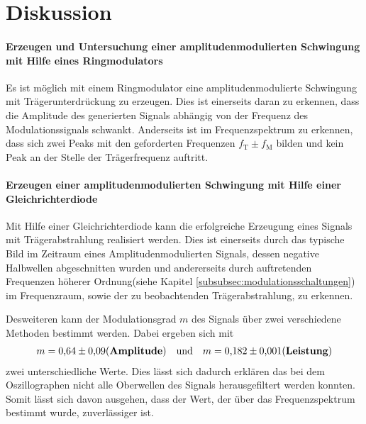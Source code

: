 \FloatBarrier
\section{Diskussion}
\label{sec:Diskussion}

\paragraph{Erzeugen und Untersuchung einer amplitudenmodulierten Schwingung mit
Hilfe eines Ringmodulators}
Es ist möglich mit einem Ringmodulator
eine amplitudenmodulierte Schwingung
mit Trägerunterdrückung zu erzeugen.
Dies ist einerseits daran zu erkennen,
dass die Amplitude des generierten Signals abhängig
von der Frequenz des Modulationssignals schwankt.
%
Anderseits ist im Frequenzspektrum zu erkennen, dass sich zwei
Peaks mit den geforderten Frequenzen $f_{\text{T}}\pm f_{\text{M}}$
bilden
und kein Peak an der Stelle der Trägerfrequenz
auftritt.
\paragraph{Erzeugen einer amplitudenmodulierten Schwingung
mit Hilfe einer Gleichrichterdiode}
Mit Hilfe einer Gleichrichterdiode kann
die erfolgreiche Erzeugung eines Signals mit Trägerabstrahlung
realisiert werden.
Dies ist einerseits durch das typische Bild im Zeitraum eines
Amplitudenmodulierten Signals, dessen negative Halbwellen
abgeschnitten wurden
und andererseits durch auftretenden Frequenzen höherer
Ordnung(siehe Kapitel \ref{subsubsec:modulationsschaltungen})
im Frequenzraum, sowie der zu beobachtenden
Trägerabstrahlung, zu erkennen.

Desweiteren kann der Modulationsgrad $m$ des Signals
über zwei verschiedene
Methoden bestimmt werden. Dabei ergeben sich mit
\begin{align*}
m=\num{0.64(9)}(\textbf{Amplitude})& &\text{und}& & m = \num{0.182(1)}\notag
(\textbf{Leistung})
\end{align*}
zwei unterschiedliche Werte. Dies lässt sich dadurch erklären das bei dem Oszillographen
nicht alle Oberwellen des Signals herausgefiltert werden konnten.
Somit lässt sich davon ausgehen, dass der Wert, der über das Frequenzspektrum bestimmt
wurde, zuverlässiger ist.
